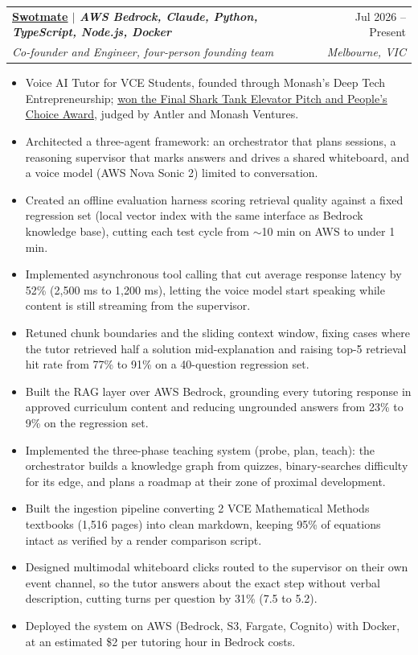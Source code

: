 \documentclass[letterpaper,11pt]{article}
\makeatletter
\newcommand{\resumeItem}[1]{\item\small{{#1 \vspace{-2pt}}}}
\newcommand{\resumeSubheading}[4]{
  \vspace{-2pt}\item
    \begin{tabular*}{0.97\textwidth}[t]{l@{\extracolsep{\fill}}r}
      \textbf{#1} & #2 \\
      \textit{\small#3} & \textit{\small #4} \\
    \end{tabular*}\vspace{-7pt}
}
\newcommand{\resumeItemListStart}{\begin{itemize}}
\newcommand{\resumeItemListEnd}{\end{itemize}\vspace{-5pt}}
\makeatother
\begin{document}
    \resumeSubheading
      {\href{https://alpetuna.github.io/TutorAI-FIT3195/}{\underline{Swotmate}} $|$ {\mdseries\itshape\small AWS Bedrock, Claude, Python, TypeScript, Node.js, Docker}}{Jul 2026 -- Present}
      {Co-founder and Engineer, four-person founding team}{Melbourne, VIC}
      \resumeItemListStart
        \resumeItem{Voice AI Tutor for VCE Students, founded through Monash's Deep Tech Entrepreneurship; \href{https://www.linkedin.com/feed/update/urn:li:activity:7519564353310932992/}{\underline{won the Final Shark Tank Elevator Pitch and People's Choice Award}}, judged by Antler and Monash Ventures.}
        \resumeItem{Architected a three-agent framework: an orchestrator that plans sessions, a reasoning supervisor that marks answers and drives a shared whiteboard, and a voice model (AWS Nova Sonic 2) limited to conversation.}
        \resumeItem{Created an offline evaluation harness scoring retrieval quality against a fixed regression set (local vector index with the same interface as Bedrock knowledge base), cutting each test cycle from $\sim$10 min on AWS to under 1 min.}
        \resumeItem{Implemented asynchronous tool calling that cut average response latency by 52\% (2,500 ms to 1,200 ms), letting the voice model start speaking while content is still streaming from the supervisor.}
        \resumeItem{Retuned chunk boundaries and the sliding context window, fixing cases where the tutor retrieved half a solution mid-explanation and raising top-5 retrieval hit rate from 77\% to 91\% on a 40-question regression set.}
        \resumeItem{Built the RAG layer over AWS Bedrock, grounding every tutoring response in approved curriculum content and reducing ungrounded answers from 23\% to 9\% on the regression set.}
        \resumeItem{Implemented the three-phase teaching system (probe, plan, teach): the orchestrator builds a knowledge graph from quizzes, binary-searches difficulty for its edge, and plans a roadmap at their zone of proximal development.}
        \resumeItem{Built the ingestion pipeline converting 2 VCE Mathematical Methods textbooks (1,516 pages) into clean markdown, keeping 95\% of equations intact as verified by a render comparison script.}
        \resumeItem{Designed multimodal whiteboard clicks routed to the supervisor on their own event channel, so the tutor answers about the exact step without verbal description, cutting turns per question by 31\% (7.5 to 5.2).}
        \resumeItem{Deployed the system on AWS (Bedrock, S3, Fargate, Cognito) with Docker, at an estimated \$2 per tutoring hour in Bedrock costs.}
      \resumeItemListEnd
\end{document}
